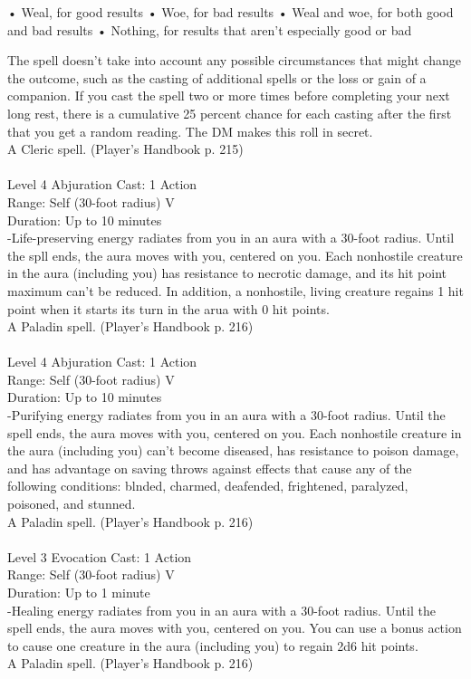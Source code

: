 \documentclass[10pt,twocolumn]{report}
\begin{document}
• Weal, for good results 
• Woe, for bad results 
• Weal and woe, for both good and bad results 
• Nothing, for results that aren’t especially good or bad 

The spell doesn’t take into account any possible circumstances that might change the outcome, such as the casting of additional spells or the loss or gain of a companion.    If you cast the spell two or more times before completing your next long rest, there is a cumulative 25 percent chance for each casting after the first that you get a random reading. The DM makes this roll in secret.\\
A Cleric spell. (Player's Handbook p. 215) \\


 \\
Level 4 \quad Abjuration \quad Cast: 1 Action\\
Range: Self (30-foot radius) \quad V\\
Duration: Up to 10 minutes \quad \\
-Life-preserving energy radiates from you in an aura with a 30-foot radius. 
Until the spll ends, the aura moves with you, centered on you. Each nonhostile creature in the aura (including you) has resistance to necrotic damage, and its hit point maximum can’t be reduced. In addition, a nonhostile, living creature regains 1 hit point when it starts its turn in the arua with 0 hit points.\\
A Paladin spell. (Player's Handbook p. 216) \\


 \\
Level 4 \quad Abjuration \quad Cast: 1 Action\\
Range: Self (30-foot radius) \quad V\\
Duration: Up to 10 minutes \quad \\
-Purifying energy radiates from you in an aura with a 30-foot radius. 
Until the spell ends, the aura moves with you, centered on you. Each nonhostile creature in the aura (including you) can’t become diseased, has resistance to poison damage, and has advantage on saving throws against effects that cause any of the following conditions: blnded, charmed, deafended, frightened, paralyzed, poisoned, and stunned.\\
A Paladin spell. (Player's Handbook p. 216) \\


 \\
Level 3 \quad Evocation \quad Cast: 1 Action\\
Range: Self (30-foot radius) \quad V\\
Duration: Up to 1 minute \quad \\
-Healing energy radiates from you in an aura with a 30-foot radius. 
Until the spell ends, the aura moves with you, centered on you. You can use a bonus action to cause one creature in the aura (including you) to regain 2d6 hit points.\\
A Paladin spell. (Player's Handbook p. 216) \\
\end{document}
